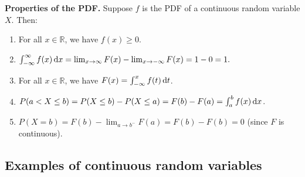 \documentclass[10pt]{article}
\newcommand{\R}{\mathbb{R}}
\theoremstyle{newstyle}
\begin{document}
\newpage 
{\bf Properties of the PDF.} Suppose $f$ is the PDF of a continuous random variable $X$.
Then:\begin{enumerate}[(1)]
    \item For all $x \in \R$, we have $f(x) \geq 0$.
    \item $\int_{-\infty}^\infty f(x)\,{\rm d}x = \lim_{x\to\infty} F(x) - \lim_{x\to-\infty} F(x) 
    = 1 - 0 = 1.$
    \item For all $x \in \R$, we have $F(x) = \int_{-\infty}^x f(t)\,{\rm d}t$. \vspace{-1ex}
    \item $P(a < X \leq b) = P(X \leq b) - P(X \leq a) = F(b) - F(a) = \int_a^b f(x) \, {\rm d}x$.
    \item $P(X = b) = F(b) - \lim_{a\to b^-} F(a) = F(b) - F(b) = 0$ (since $F$ is continuous).
\end{enumerate}

\subsection{Examples of continuous random variables}
\end{document}
